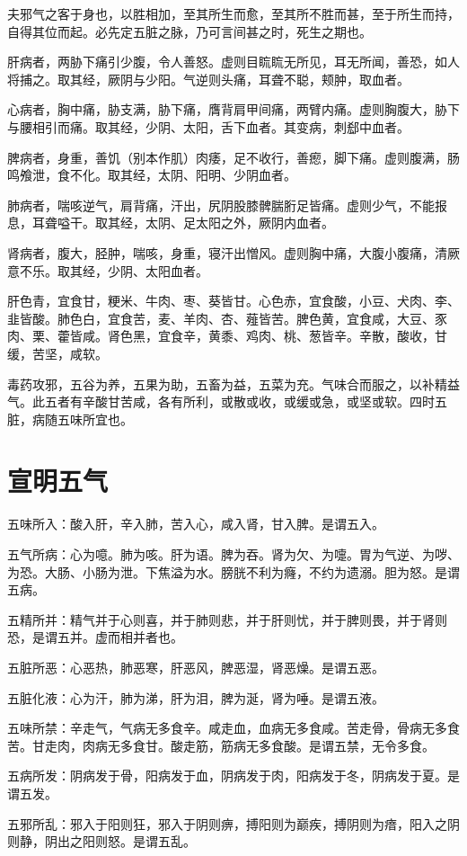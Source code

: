 \documentclass{article}%
\begin{document}
夫邪气之客于身也，以胜相加，至其所生而愈，至其所不胜而甚，至于所生而持，自得其位而起。必先定五脏之脉，乃可言间甚之时，死生之期也。

肝病者，两胁下痛引少腹，令人善怒。虚则目䀮䀮无所见，耳无所闻，善恐，如人将捕之。取其经，厥阴与少阳。气逆则头痛，耳聋不聪，颊肿，取血者。

心病者，胸中痛，胁支满，胁下痛，膺背肩甲间痛，两臂内痛。虚则胸腹大，胁下与腰相引而痛。取其经，少阴、太阳，舌下血者。其变病，刺郄中血者。

脾病者，身重，善饥（别本作肌）肉痿，足不收行，善瘛，脚下痛。虚则腹满，肠鸣飧泄，食不化。取其经，太阴、阳明、少阴血者。

肺病者，喘咳逆气，肩背痛，汗出，尻阴股膝髀腨胻足皆痛。虚则少气，不能报息，耳聋嗌干。取其经，太阴、足太阳之外，厥阴内血者。

肾病者，腹大，胫肿，喘咳，身重，寝汗出憎风。虚则胸中痛，大腹小腹痛，清厥意不乐。取其经，少阴、太阳血者。

肝色青，宜食甘，粳米、牛肉、枣、葵皆甘。心色赤，宜食酸，小豆、犬肉、李、韭皆酸。肺色白，宜食苦，麦、羊肉、杏、薤皆苦。脾色黄，宜食咸，大豆、豕肉、栗、藿皆咸。肾色黑，宜食辛，黄黍、鸡肉、桃、葱皆辛。辛散，酸收，甘缓，苦坚，咸软。

毒药攻邪，五谷为养，五果为助，五畜为益，五菜为充。气味合而服之，以补精益气。此五者有辛酸甘苦咸，各有所利，或散或收，或缓或急，或坚或软。四时五脏，病随五味所宜也。
\section{宣明五气}
五味所入：酸入肝，辛入肺，苦入心，咸入肾，甘入脾。是谓五入。

五气所病：心为噫。肺为咳。肝为语。脾为吞。肾为欠、为嚏。胃为气逆、为哕、为恐。大肠、小肠为泄。下焦溢为水。膀胱不利为癃，不约为遗溺。胆为怒。是谓五病。

五精所并：精气并于心则喜，并于肺则悲，并于肝则忧，并于脾则畏，并于肾则恐，是谓五并。虚而相并者也。

五脏所恶：心恶热，肺恶寒，肝恶风，脾恶湿，肾恶燥。是谓五恶。

五脏化液：心为汗，肺为涕，肝为泪，脾为涎，肾为唾。是谓五液。

五味所禁：辛走气，气病无多食辛。咸走血，血病无多食咸。苦走骨，骨病无多食苦。甘走肉，肉病无多食甘。酸走筋，筋病无多食酸。是谓五禁，无令多食。

五病所发：阴病发于骨，阳病发于血，阴病发于肉，阳病发于冬，阴病发于夏。是谓五发。

五邪所乱：邪入于阳则狂，邪入于阴则痹，搏阳则为巅疾，搏阴则为瘖，阳入之阴则静，阴出之阳则怒。是谓五乱。
\end{document}
